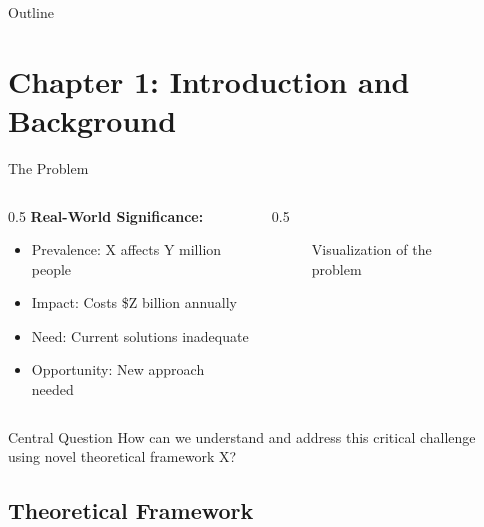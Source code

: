 \documentclass[aspectratio=169,12pt]{beamer}
\begin{document}
\begin{frame}{Outline}
  \tableofcontents
\end{frame}


\section{Chapter 1: Introduction and Background}

\begin{frame}{The Problem}
  \begin{columns}[T]
    
    \begin{column}{0.5\textwidth}
      \textbf{Real-World Significance:}
      \begin{itemize}
        \item Prevalence: X affects Y million people
        \item Impact: Costs \$Z billion annually
        \item Need: Current solutions inadequate
        \item Opportunity: New approach needed
      \end{itemize}
    \end{column}
    
    \begin{column}{0.5\textwidth}
      \begin{figure}
        \centering
        \caption{Visualization of the problem}
      \end{figure}
    \end{column}
    
  \end{columns}
  
  \vspace{0.5cm}
  
  \begin{alertblock}{Central Question}
    How can we understand and address this critical challenge using novel theoretical framework X?
  \end{alertblock}
\end{frame}

\subsection{Theoretical Framework}
\end{document}
